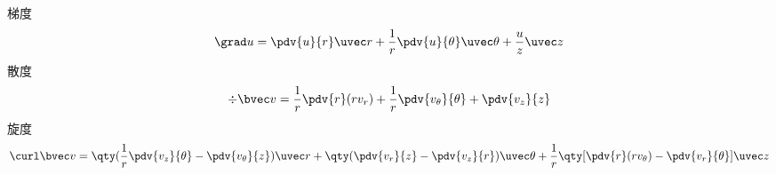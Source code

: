 
梯度
\begin{equation}
\grad u = \pdv{u}{r} \uvec r + \frac{1}{r}\pdv{u}{\theta}\uvec \theta + \frac{u}{z}\uvec z
\end{equation}
散度
\begin{equation}
\div \bvec v = \frac{1}{r}\pdv{r} (r v_r) + \frac{1}{r} \pdv{v_\theta}{\theta} + \pdv{v_z}{z}
\end{equation}
旋度
\begin{equation}
\curl \bvec v = \qty(\frac{1}{r}\pdv{v_z}{\theta} - \pdv{v_\theta}{z})\uvec r + \qty(\pdv{v_r}{z} - \pdv{v_z}{r})\uvec \theta + \frac{1}{r}\qty[\pdv{r}(r v_\theta) - \pdv{v_r}{\theta}] \uvec z
\end{equation}
